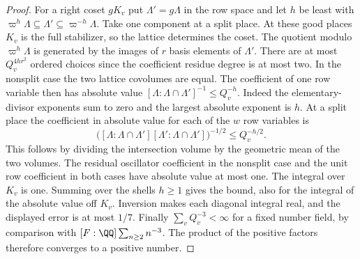 \documentclass[a4paper,11pt]{article}
\theoremstyle{definition}
\theoremstyle{remark}
\numberwithin{equation}{section}
\begin{document}
\begin{proof}
For a right coset \(gK_v\) put \(\Lambda'=g\Lambda\) in
the row space and let \(h\) be least with
\(\varpi^h\Lambda\subseteq\Lambda'\subseteq\varpi^{-h}\Lambda\).
Take one component at a split place. At these good places
\(K_v\) is the full stabilizer, so the lattice determines
the coset. The quotient modulo \(\varpi^h\Lambda\) is
generated by the images of \(r\) basis elements of \(\Lambda'\).
There are at most \(Q_v^{4hr^2}\) ordered choices since
the coefficient residue degree is at most two. In the
nonsplit case the two lattice covolumes are equal. The
coefficient of one row variable then has absolute value
\([\Lambda:\Lambda\cap\Lambda']^{-1}\le Q_v^{-h}\).
Indeed the elementary-divisor exponents sum to zero and the
largest absolute exponent is \(h\). At a split place the
coefficient in absolute value for each of the \(w\) row
variables is
\[
  \bigl([\Lambda:\Lambda\cap\Lambda']
          [\Lambda':\Lambda\cap\Lambda']\bigr)^{-1/2}
                      \le Q_v^{-h/2}.
\]
This follows by dividing the intersection volume by the
geometric mean of the two volumes. The residual oscillator
coefficient in the nonsplit case and the unit row coefficient
in both cases have absolute value at most one. The integral
over \(K_v\) is one. Summing over the shells \(h\ge1\) gives
the bound, also for the integral of the absolute value off
\(K_v\). Inversion makes each diagonal integral real, and
the displayed error is at most \(1/7\). Finally
\(\sum_v Q_v^{-3}<\infty\) for a fixed number field, by
comparison with \([F:\QQ]\sum_{n\ge2}n^{-3}\).
The product of the positive factors therefore converges to
a positive number.
\end{proof}
\end{document}
